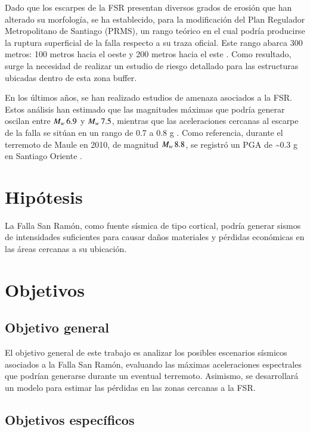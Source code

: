 Dado que los escarpes de la FSR presentan diversos grados de erosión que han alterado su morfología, se ha establecido, para la modificación del Plan Regulador Metropolitano de Santiago (PRMS), un rango teórico en el cual podría producirse la ruptura superficial de la falla respecto a su traza oficial. Este rango abarca 300 metros: 100 metros hacia el oeste y 200 metros hacia el este . Como resultado, surge la necesidad de realizar un estudio de riesgo detallado para las estructuras ubicadas dentro de esta zona buffer.

En los últimos años, se han realizado estudios de amenaza asociados a la FSR. Estos análisis han estimado que las magnitudes máximas que podría generar oscilan entre \(M_w{}\,6.9\) y \(M_w{}\,7.5\), mientras que las aceleraciones cercanas al escarpe de la falla se sitúan en un rango de 0.7 a 0.8 g . Como referencia, durante el terremoto de Maule en 2010, de magnitud \(M_w{}\,8.8\), se registró un PGA de \textasciitilde 0.3 g en Santiago Oriente .

\section{Hipótesis}

La Falla San Ramón, como fuente sísmica de tipo cortical, podría generar sismos de intensidades suficientes para causar daños materiales y pérdidas económicas en las áreas cercanas a su ubicación.

\section{Objetivos}
\subsection{Objetivo general}

El objetivo general de este trabajo es analizar los posibles escenarios sísmicos asociados a la Falla San Ramón, evaluando las máximas aceleraciones espectrales que podrían generarse durante un eventual terremoto. Asimismo, se desarrollará un modelo para estimar las pérdidas en las zonas cercanas a la FSR.

\subsection{Objetivos específicos}

